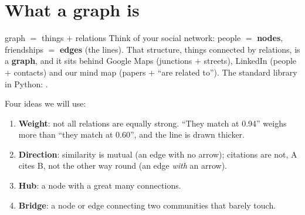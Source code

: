 \documentclass[11pt,a4paper]{article}
\begin{document}

\section{What a graph is}

\begin{concepto}{graph $=$ things $+$ relations}
Think of your social network: people $=$ \textbf{nodes}, friendships $=$ \textbf{edges} (the
lines). That structure, things connected by relations, is a \textbf{graph}, and it sits behind
Google Maps (junctions $+$ streets), LinkedIn (people $+$ contacts) and our mind map (papers
$+$ ``are related to''). The standard library in Python: .
\end{concepto}

Four ideas we will use:
\begin{enumerate}
  \item \textbf{Weight}: not all relations are equally strong. ``They match at 0.94'' weighs
        more than ``they match at 0.60'', and the line is drawn thicker.
  \item \textbf{Direction}: similarity is mutual (an edge with no arrow); citations are not,
        A cites B, not the other way round (an edge \emph{with} an arrow).
  \item \textbf{Hub}: a node with a great many connections.
  \item \textbf{Bridge}: a node or edge connecting two communities that barely touch.
\end{enumerate}

\begin{center}
\end{center}
\end{document}
